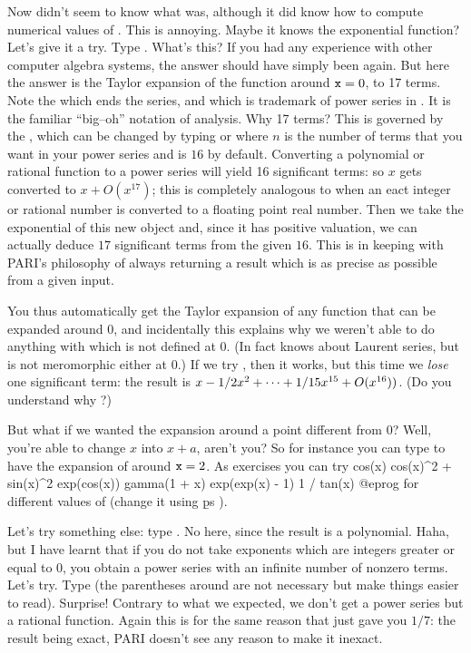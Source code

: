 \medskip
Now  didn't seem to know what  was, although it did know
how to compute numerical values of . This is annoying. Maybe it
knows the exponential function? Let's give it a try. Type .
What's this? If you had any experience with other computer algebra systems,
the answer should have simply been  again. But here the answer is
the Taylor expansion of the function around ${\tt x}=0$, to 17 terms. Note
the  which ends the series, and which is trademark of power
series in . It is the familiar ``big--oh'' notation of analysis.
Why 17 terms? This is governed by the , which
can be changed by typing  or  where $n$ is the number of terms that you want in your power series
and is $16$ by default. Converting a polynomial or rational function to a
power series will yield 16 significant terms: so $x$ gets converted to $x +
O(x^{17})$; this is completely analogous to  when an eact
integer or rational number is converted to a floating point real number.
Then we take the exponential of this new object and, since it has positive
valuation, we can actually deduce $17$ significant terms from the given $16$.
This is in keeping with PARI's philosophy of always returning a result which
is as precise as possible from a given input.

You thus automatically get the Taylor expansion of any function that can be
expanded around $0$, and incidentally this explains why we weren't able to do
anything with  which is not defined at $0$. (In fact 
knows about Laurent series, but  is not meromorphic either at
$0$.) If we try , then it works, but this time we \emph{lose}
one significant term: the result is $x - 1/2\*x^2 + \dots + 1/15\*x^{15} +
O(x^{16}))$. (Do you understand why ?)

But what if we wanted the expansion around a point different from 0? Well,
you're able to change $x$ into $x+a$, aren't you? So for instance you can
type  to have the expansion of  around ${\tt x}=2$. As
exercises you can try
\bprog
  cos(x)
  cos(x)^2 + sin(x)^2
  exp(cos(x))
  gamma(1 + x)
  exp(exp(x) - 1)
  1 / tan(x)
@eprog\noindent
for different values of  (change it using \b{ps}
).

Let's try something else: type . No  here, since
the result is a polynomial.  Haha, but I have learnt that if you do not take
exponents which are integers greater or equal to 0, you obtain a power series
with an infinite number of nonzero terms. Let's try.  Type
 (the parentheses around  are not necessary but
make things easier to read). Surprise! Contrary to what we expected, we don't
get a power series but a rational function. Again this is for the same reason
that  just gave you $1/7$: the result being exact, PARI doesn't see
any reason to make it inexact.

